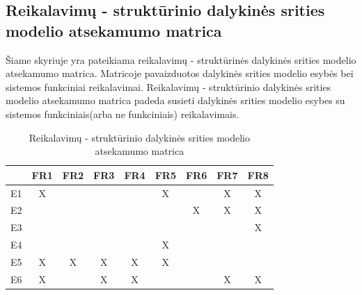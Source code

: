 \documentclass{VUMIFPSkursinis}
\begin{document}
            \subsection{Reikalavimų - struktūrinio dalykinės srities modelio atsekamumo matrica}
            Šiame skyriuje yra pateikiama reikalavimų - struktūrinės dalykinės srities modelio atsekamumo matrica. Matricoje pavaizduotos dalykinės srities modelio esybės bei sistemos funkciniai reikalavimai. Reikalavimų - struktūrinio dalykinės srities modelio atsekamumo matrica padeda susieti dalykinės srities modelio esybes su sistemos funkciniais(arba ne funkciniais) reikalavimais.
            \begin{table}[H]\footnotesize
                \centering
                \caption{Reikalavimų - struktūrinio dalykinės srities modelio atsekamumo matrica}
                {
                    \begin{tabular}{|c|c|c|c|c|c|c|c|c| }
                    \hline
                        & FR1 & FR2 & FR3 & FR4 & FR5 & FR6 & FR7 & FR8 \\ 
                    \hline
                        E1 & X   &     &     &     & X   &     & X   & X    \\  
                    \hline
                        E2 &     &     &     &     &     & X   & X   & X    \\ 
                    \hline
                        E3 &     &     &     &     &     &     &     & X    \\ 
                    \hline
                        E4 &     &     &     &     & X   &     &     &      \\ 
                    \hline
                        E5 & X   & X   & X   & X   & X   &     &     &      \\ 
                    \hline
                        E6 & X   &     & X   & X   &     &     & X   & X    \\ 
                    \hline 
                    \end{tabular}
                }
            \end{table}
      
\end{document}
